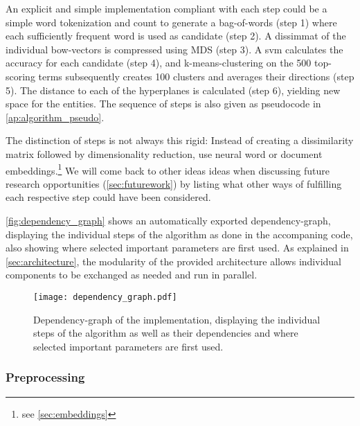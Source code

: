 An explicit and simple implementation compliant with each step could be a simple word tokenization and count to generate a bag-of-words (step 1) where each sufficiently frequent word is used as candidate (step 2). A \gls{dissimmat} of the individual \gls{bow}-vectors is compressed using MDS (step 3). A \gls{svm} calculates the accuracy for each candidate (step 4), and k-means-clustering on the 500 top-scoring terms subsequently creates 100 clusters and averages their directions (step 5). The distance to each of the hyperplanes is calculated (step 6), yielding new space for the entities. The sequence of steps is also given as pseudocode in \autoref{ap:algorithm_pseudo}. 
 
 The distinction of steps is not always this rigid: Instead of creating a dissimilarity matrix followed by dimensionality reduction, \cite{Ager2018,Alshaikh2020} use neural word or document embeddings.\footnote{see \autoref{sec:embeddings}} %
 We will come back to other ideas ideas when discussing future research opportunities (\autoref{sec:futurework}) by listing what other ways of fulfilling each respective step could have been considered.

\autoref{fig:dependency_graph} shows an automatically exported dependency-graph, displaying the individual steps of the algorithm as done in the accompaning code, also showing where selected important parameters are first used. As explained in \autoref{sec:architecture}, the modularity of the provided architecture allows individual components to be exchanged as needed and run in parallel.


\begin{figure}[h]
	\begin{center}
	  \texttt{[image: dependency\_graph.pdf]}
	  \caption[Dependency-graph of the implementation]{Dependency-graph of the implementation, displaying the individual steps of the algorithm as well as their dependencies and where selected important parameters are first used.}
	  \label{fig:dependency_graph} %
	\end{center}
\end{figure}


\subsubsection{Preprocessing}

